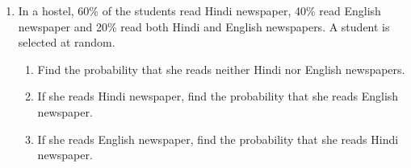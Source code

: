 \renewcommand{\theequation}{\theenumi}
\begin{enumerate}[label=\thesection.\arabic*.,ref=\thesection.\theenumi]
\item In a hostel, 60\% of the students read Hindi
newspaper, 40\% read English newspaper and
20\% read both Hindi and English newspapers.
A student is selected at random.
\begin{enumerate}
\item Find the probability that she reads
neither Hindi nor English newspapers.
\item If she reads Hindi newspaper, find the
probability that she reads English newspaper.
\item If she reads English newspaper, find
the probability that she reads Hindi newspaper.
\end{enumerate}

\end{enumerate}